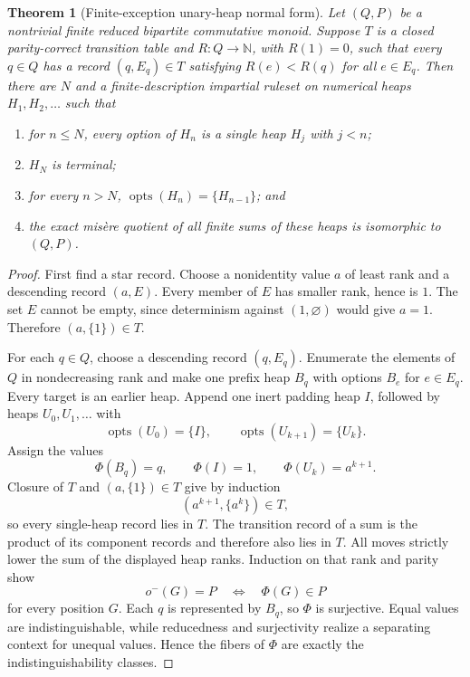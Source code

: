\documentclass[11pt]{article}
\newtheorem{theorem}{Theorem}[section]
\theoremstyle{definition}
\theoremstyle{remark}
\newcommand{\N}{\mathbb N}
\newcommand{\opts}{\operatorname{opts}}
\begin{document}
\begin{theorem}[Finite-exception unary-heap normal form]
\label{thm:normalform}
Let $(Q,P)$ be a nontrivial finite reduced bipartite commutative monoid.
Suppose $T$ is a closed parity-correct transition table and $R:Q\to\N$, with
$R(1)=0$, such that every $q\in Q$ has a record $(q,E_q)\in T$ satisfying
$R(e)<R(q)$ for all $e\in E_q$.  Then there are $N$ and a finite-description
impartial ruleset on numerical heaps $H_1,H_2,\ldots$ such that
\begin{enumerate}
\item for $n\le N$, every option of $H_n$ is a single heap $H_j$ with $j<n$;
\item $H_N$ is terminal;
\item for every $n>N$, $\opts(H_n)=\{H_{n-1}\}$; and
\item the exact mis\`ere quotient of all finite sums of these heaps is
      isomorphic to $(Q,P)$.
\end{enumerate}
\end{theorem}

\begin{proof}
First find a star record.  Choose a nonidentity value $a$ of least rank and a
descending record $(a,E)$.  Every member of $E$ has smaller rank, hence is
$1$.  The set $E$ cannot be empty, since determinism against
$(1,\varnothing)$ would give $a=1$.  Therefore $(a,\{1\})\in T$.

For each $q\in Q$, choose a descending record $(q,E_q)$.  Enumerate the
elements of $Q$ in nondecreasing rank and make one prefix heap $B_q$ with
options $B_e$ for $e\in E_q$.  Every target is an earlier heap.  Append one
inert padding heap $I$, followed by heaps $U_0,U_1,\ldots$ with
\[
 \opts(U_0)=\{I\},\qquad \opts(U_{k+1})=\{U_k\}.
\]
Assign the values
\[
 \Phi(B_q)=q,\qquad \Phi(I)=1,\qquad
 \Phi(U_k)=a^{k+1}.
\]
Closure of $T$ and $(a,\{1\})\in T$ give by induction
\[
 (a^{k+1},\{a^k\})\in T,
\]
so every single-heap record lies in $T$.  The transition record of a sum is
the product of its component records and therefore also lies in $T$.
All moves strictly lower the sum of the displayed heap ranks.  Induction on
that rank and parity show
\[
 o^-(G)=P\quad\Longleftrightarrow\quad\Phi(G)\in P
\]
for every position $G$.  Each $q$ is represented by $B_q$, so $\Phi$ is
surjective.  Equal values are indistinguishable, while reducedness and
surjectivity realize a separating context for unequal values.  Hence the
fibers of $\Phi$ are exactly the indistinguishability classes.
\end{proof}
\end{document}
